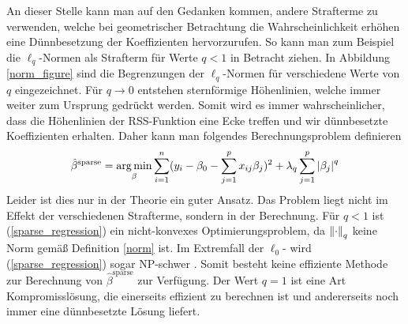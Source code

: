 An dieser Stelle kann man auf den Gedanken kommen, andere Strafterme zu verwenden, welche bei geometrischer Betrachtung die Wahrscheinlichkeit erhöhen eine Dünnbesetzung der Koeffizienten hervorzurufen. So kann man zum Beispiel die $\ell_q$-Normen als Strafterm für Werte $q < 1$ in Betracht ziehen. In Abbildung \ref{norm_figure} sind die Begrenzungen der $\ell_q$-Normen für verschiedene Werte von $q$ eingezeichnet. Für $q \rightarrow 0$ entstehen sternförmige Höhenlinien, welche immer weiter zum Ursprung gedrückt werden. Somit wird es immer wahrscheinlicher, dass die Höhenlinien der RSS-Funktion eine Ecke treffen und wir dünnbesetzte Koeffizienten erhalten. Daher kann man folgendes Berechnungsproblem definieren
\begin{align}
\label{sparse_regression}
\hat{\beta}^{\text{sparse}} = \operatorname*{arg\,min}_{\beta} \sum_{i=1}^{n}(y_i - \beta_0 - \sum_{j=1}^p x_{ij}\beta_j)^2 + \lambda_q\sum_{j=1}^p \left|\beta_j\right|^q
\end{align}
Leider ist dies nur in der Theorie ein guter Ansatz. Das Problem liegt nicht im Effekt der verschiedenen Strafterme, sondern in der Berechnung. Für $q < 1$ ist (\ref{sparse_regression}) ein nicht-konvexes Optimierungsproblem, da $\left\lVert \cdot \right\rVert_q$ keine Norm gemäß Definition \ref{norm} ist. Im Extremfall der $\ell_0$- wird (\ref{sparse_regression}) sogar NP-schwer \cite{foucart}. Somit besteht keine effiziente Methode zur Berechnung von $\hat{\beta}^{\text{sparse}}$ zur Verfügung. Der Wert $q = 1$ ist eine Art Kompromisslösung, die einerseits effizient zu berechnen ist und andererseits noch immer eine dünnbesetzte Lösung liefert.

